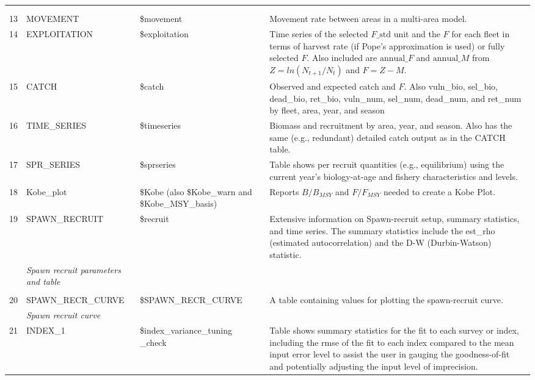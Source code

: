 \begin{landscape}
\begin{longtable}{p{1.5cm} p{5.5cm} >{\RaggedRight\arraybackslash}p{4.25cm} p{9.75cm}}
       & & & \\
       & & & \Bstrut\\
    13 & MOVEMENT & \$movement & Movement rate between areas in a multi-area model. \Bstrut\\
    14 & EXPLOITATION & \$exploitation & Time series of the selected $F\text{\_std}$ unit and the $F$ for each fleet in terms of harvest rate (if Pope's approximation is used) or fully selected $F$. Also included are $\text{annual\_}F$ and $\text{annual\_}M$ from $Z = ln(N_{t+1}/N_{t})$ and $F = Z-M$. \Bstrut\\
    15 & CATCH & \$catch & Observed and expected catch and $F$. Also vuln\_bio, sel\_bio, dead\_bio, ret\_bio, vuln\_num, sel\_num, dead\_num, and ret\_num by fleet, area, year, and season \Bstrut\\
    16 & TIME\_SERIES & \$timeseries & Biomass and recruitment by area, year, and season. Also has the same (e.g., redundant) detailed catch output as in the CATCH table. \Bstrut\\
    17 & SPR\_SERIES & \$sprseries & Table shows per recruit quantities (e.g., equilibrium) using the current year's biology-at-age and fishery characteristics and levels. \Bstrut\\
    18 & Kobe\_plot & \$Kobe (also \$Kobe\_warn and \$Kobe\_MSY\_basis) & Reports $B/B_{MSY}$ and $F/F_{MSY}$ needed to create a Kobe Plot. \Bstrut\\
    19 & SPAWN\_RECRUIT & \$recruit & \multirow{1}{1cm}[-0.25cm]{\parbox{9.5cm}{Extensive information on Spawn-recruit setup, summary statistics, and time series. The summary statistics include the est\_rho (estimated autocorrelation) and the D-W (Durbin-Watson) statistic.}} \\
       & \textit{Spawn recruit parameters and table} & & \Bstrut\\
       & & & \\
    20 & SPAWN\_RECR\_CURVE & \$SPAWN\_RECR\_CURVE & \multirow{1}{1cm}[-0.25cm]{\parbox{9.5cm}{A table containing values for plotting the spawn-recruit curve.}} \\ 
       & \textit{Spawn recruit curve} & & \Bstrut\\
    21 & INDEX\_1 & \$index\_variance\_tuning \_check & Table shows summary statistics for the fit to each survey or index, including the \gls{rmse} of the fit to each index compared to the mean input error level to assist the user in gauging the goodness-of-fit and potentially adjusting the input level of imprecision. \Bstrut\\

\end{longtable}
\end{landscape}
